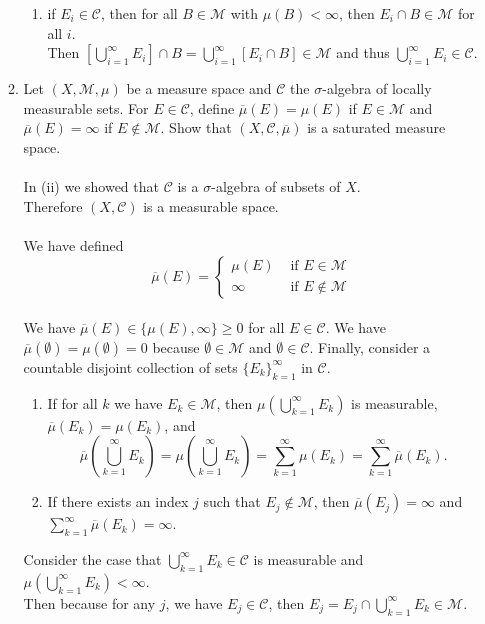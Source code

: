 \begin{enumerate}
\begin{enumerate}[label=(\roman*),align=left]
\begin{enumerate}[label=(\roman*),align=left]
			\item if $E_i\in\mathcal{C}$, then for all $B\in\mathcal{M}$ with $\mu(B)<\infty$, then $E_i\cap B\in\mathcal{M}$ for all $i$.\\
			Then $\left[\bigcup_{i=1}^\infty E_i\right]\cap B=\bigcup_{i=1}^\infty [E_i\cap B]\in\mathcal{M}$ and thus $\bigcup_{i=1}^\infty E_i\in\mathcal{C}$.
		\end{enumerate}
		\item Let $(X,\mathcal{M},\mu)$ be a measure space and $\mathcal{C}$ the $\sigma$-algebra of locally measurable sets.
		For $E\in\mathcal{C}$, define $\overline\mu(E)=\mu(E)$ if $E\in\mathcal{M}$ and $\overline\mu(E)=\infty$ if $E\notin\mathcal{M}$.
		Show that $(X,\mathcal{C},\overline\mu)$ is a saturated measure space.\\
		\\In (ii) we showed that $\mathcal{C}$ is a $\sigma$-algebra of subsets of $X$.\\
		Therefore $(X,\mathcal{C})$ is a measurable space.\\
		\\We have defined
		\[
			\overline\mu(E)=
			\begin{cases}
				\mu(E)&\text{ if }E\in\mathcal{M}\\
				\infty&\text{ if }E\notin\mathcal{M}
			\end{cases}	
		\]
		\\We have $\overline\mu(E)\in\{\mu(E),\infty\}\ge0$ for all $E\in\mathcal{C}$.
		We have $\overline\mu(\emptyset)=\mu(\emptyset)=0$ because $\emptyset\in\mathcal{M}$ and $\emptyset\in\mathcal{C}$.
		Finally, consider a countable disjoint collection of sets $\{E_k\}_{k=1}^\infty$ in $\mathcal{C}$.
		\begin{enumerate}[label=(\roman*),align=left]  
			\item If for all $k$ we have $E_k\in\mathcal{M}$, then $\mu(\bigcup_{k=1}^\infty E_k)$ is measurable, $\overline\mu(E_k)=\mu(E_k)$, and
			\[
				\overline\mu(\bigcup_{k=1}^\infty E_k)=\mu(\bigcup_{k=1}^\infty E_k)=\sum_{k=1}^\infty \mu(E_k)=\sum_{k=1}^\infty \overline\mu(E_k).
			\]
			\item If there exists an index $j$ such that $E_j\notin\mathcal{M}$, then $\overline\mu(E_j)=\infty$ and $\sum_{k=1}^\infty \overline\mu(E_k)=\infty$.
		\end{enumerate}
		Consider the case that $\bigcup_{k=1}^\infty E_k\in\mathcal{C}$ is measurable and $\mu(\bigcup_{k=1}^\infty E_k)<\infty$. 
		\\Then because for any $j$, we have $E_j\in\mathcal{C}$, then $E_j=E_j\cap\bigcup_{k=1}^\infty E_k\in\mathcal{M}$.\\

\end{enumerate}
\end{enumerate}
